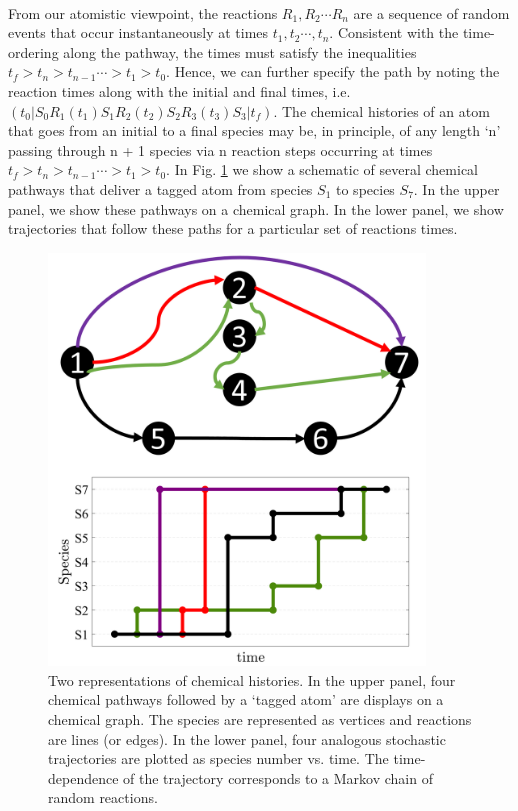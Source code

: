 \paragraph{}
From our atomistic viewpoint, the reactions $R_1, R_2 \cdots R_n$ are a sequence of random
events that occur instantaneously at times $t_1, t_2 \cdots, t_n$. Consistent with the time-ordering
along the pathway, the times must satisfy the inequalities $t_f > t_n > t_{n - 1} \cdots > t_1 > t_0$.
Hence, we can further specify the path by noting the reaction times along with the initial
and final times, i.e. $\left(t_0 \vert S_0R_1(t_1)S_1R_2(t_2)S_2R_3(t_3)S_3|t_f\right)$. The chemical histories of an
atom that goes from an initial to a final species may be, in principle, of any length ‘n’
passing through n + 1 species via n reaction steps occurring at times $t_f > t_n > t_{n - 1} \cdots > t_1 > t_0$. In Fig. \ref{ch2:fig1} we show a schematic of several chemical pathways that deliver a
tagged atom from species $S_1$ to species $S_7$. In the upper panel, we show these pathways
on a chemical graph. In the lower panel, we show trajectories that follow these paths
for a particular set of reactions times.
\begin{figure}[htbp]
	\caption[Two representations of chemical histories]{Two representations of chemical histories. In the upper panel, four chemical pathways
followed by a ‘tagged atom’ are displays on a chemical graph. The species are represented as
vertices and reactions are lines (or edges). In the lower panel, four analogous stochastic trajectories
are plotted as species number vs. time. The time-dependence of the trajectory corresponds to
a Markov chain of random reactions.}
    \begin{center}
	\includegraphics[width=100mm]{figs/chapter2/fig1.png}
    \end{center}
\label{ch2:fig1}
\end{figure}

